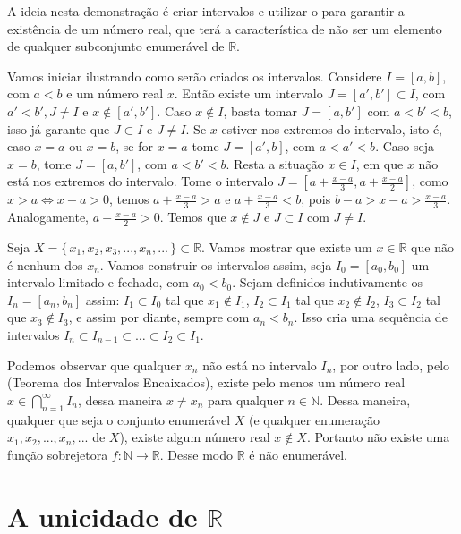 \documentclass[../main.tex]{subfiles}
\begin{document}
\begin{dem}
    A ideia nesta demonstração é criar intervalos e utilizar o  para garantir a existência de um número real, que terá a característica de não ser um elemento de qualquer subconjunto enumerável de $\mathbb{R}$.

    Vamos iniciar ilustrando como serão criados os intervalos. Considere $I = [a,b]$, com $a < b$ e um número real $x$. Então existe um intervalo $J = [a',b'] \subset I$, com  $a' < b', J \neq I$ e $x \not\in [a',b']$.
    Caso $x \not\in I$, basta tomar $J = [a,b']$ com $a < b' < b$, isso já garante que $J \subset I$ e $J \neq I$. Se $x$ estiver nos extremos do intervalo, isto é, caso $x = a$ ou $x = b$, se for $x = a$ tome $J = [a',b]$, com $a < a' < b$. Caso seja $x = b$, tome $J = [a,b']$, com 
    $a < b' < b$. Resta a situação $x \in I$, em que $x$ não está nos extremos do intervalo. Tome o intervalo $J = \left[ a + \frac{x-a}{3}, a + \frac{x-a}{2} \right]$, como $x > a \iff x-a > 0$, temos $a + \frac{x-a}{3} > a$ e 
    $a + \frac{x-a}{3} < b$, pois $b-a > x-a > \frac{x-a}{3}$. Analogamente, $a+ \frac{x-a}{2} > 0$. Temos que $x \not\in J$ e $J \subset I$ com $J \neq I$.

    Seja $X = \{\,x_1,x_2,x_3,...,x_n,...\,\} \subset \mathbb{R}$. Vamos mostrar que existe um $x \in \mathbb{R}$ que não é nenhum dos $x_n$.
    Vamos construir os intervalos assim, seja $I_0 = [a_0,b_0]$ um intervalo limitado e fechado, com $a_0 < b_0$. Sejam definidos indutivamente os $I_n = [a_n,b_n]$ assim: $I_1 \subset I_0$ tal que $x_1 \not\in I_1$, $I_2 \subset I_1$ tal que $x_2 \not\in I_2$,  $I_3 \subset I_2$ tal que $x_3 \not\in I_3$, e assim por diante, sempre com $a_n < b_n$. Isso cria uma sequência de intervalos $I_n \subset I_{n-1} \subset \dots \subset I_2 \subset I_1$.

    Podemos observar que qualquer $x_n$ não está no intervalo $I_n$, por outro lado, pelo  (Teorema dos Intervalos Encaixados), existe pelo menos um número real $x \in \bigcap^\infty_{n=1} I_n$, dessa maneira $x \neq x_n$ para qualquer $n \in \mathbb{N}$. Dessa maneira, qualquer que seja o conjunto enumerável $X$ (e qualquer enumeração $x_1, x_2,...,x_n,...$ de $X$), existe algum número real $x \not\in X$. Portanto não existe uma função sobrejetora $f \colon \mathbb{N} \to \mathbb{R}$. Desse modo $\mathbb{R}$ é não enumerável.
\end{dem}

\section{A unicidade de $\mathbb{R}$}
\end{document}

